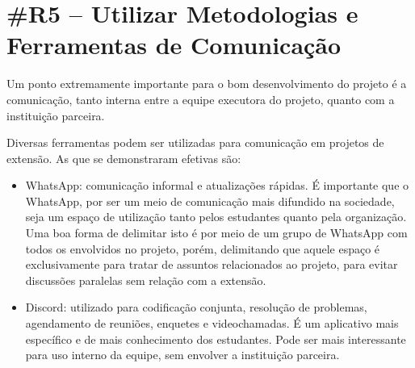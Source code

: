 \section*{\#R5 – Utilizar Metodologias e Ferramentas de Comunicação}

Um ponto extremamente importante para o bom desenvolvimento do projeto é a comunicação, tanto interna entre a equipe executora do projeto, quanto com a instituição parceira. 

Diversas ferramentas podem ser utilizadas para comunicação em projetos de extensão. As que se demonstraram efetivas são:
\begin{itemize}
    \item WhatsApp: comunicação informal e atualizações rápidas. É importante que o WhatsApp, por ser um meio de comunicação mais difundido na sociedade, seja um espaço de utilização tanto pelos estudantes quanto pela organização. Uma boa forma de delimitar isto é por meio de um grupo de WhatsApp com todos os envolvidos no projeto, porém, delimitando que aquele espaço é exclusivamente para tratar de assuntos relacionados ao projeto, para evitar discussões paralelas sem relação com a extensão.
    \item Discord: utilizado para codificação conjunta, resolução de problemas, agendamento de reuniões, enquetes e videochamadas. É um aplicativo mais específico e de mais conhecimento dos estudantes. Pode ser mais interessante para uso interno da equipe, sem envolver a instituição parceira.
\end{itemize}